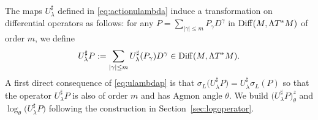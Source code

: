 \documentclass[pdftex]{sigma}
\numberwithin{equation}{section}
\theoremstyle{definition}
\begin{document}
The maps $U_\lambda^\sharp$ defined in \eqref{eq:actionulambda} induce a transformation on differential operators as follows: for any $P =\sum_{\vert \gamma\vert \leq m} P_\gamma D^\gamma$ in ${\rm Diff}(M,\Lambda T^*M)$ of order $m$, we define
\begin{equation}\label{eq:ulambdap}
U_\lambda^\sharp P:=\sum_{|\gamma|\leq m} U_\lambda^\sharp( P_\gamma) D^\gamma \in {\rm Diff}(M, \Lambda T^*M).
\end{equation}
A first direct consequence of \eqref{eq:ulambdap} is that
$\sigma_L\bigl(U_\lambda^\sharp P\bigr)= U_\lambda^\sharp\sigma_L(P) $ so that the operator $U_\lambda^\sharp P$ is also of order $m$ and has Agmon angle $\theta$. We build $\bigl(U_\lambda^\sharp P\bigr)_\theta^z$ and $\log_\theta\bigl(U_\lambda^\sharp P\bigr)$ following the construction in Section~\ref{sec:logoperator}.
\end{document}
